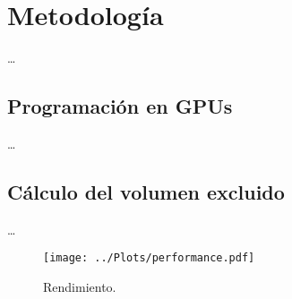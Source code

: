\chapter{Metodología}
\label{cap:methodology}

\dots

\section{Programación en GPUs}

\dots

\section{Cálculo del volumen excluido}

\dots

\begin{figure}
  \centering
  \texttt{[image: ../Plots/performance.pdf]}
  \caption{Rendimiento.}
  \label{fig:performance}
\end{figure}
